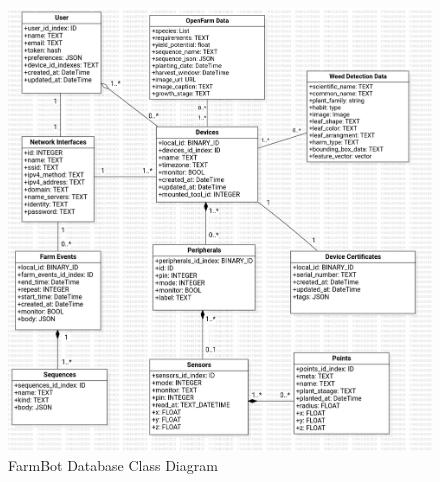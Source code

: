 \begin{figure}[H]
    \centering
    \includegraphics[width=1\textwidth]{Figures/DBDiagram.png}
    \caption{FarmBot Database Class Diagram}\label{fig:DatabaseClassDiagram}
\end{figure}

